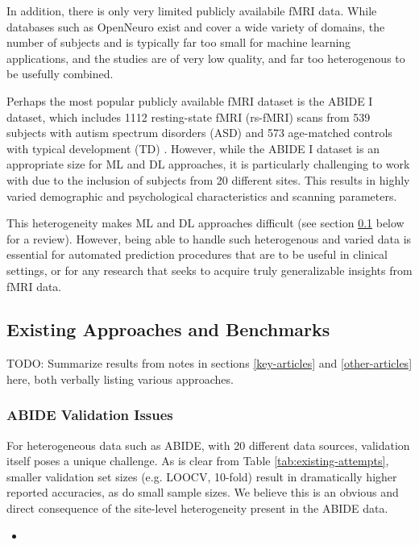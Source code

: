 \documentclass[10pt]{article}
\begin{document}
In addition, there is only very limited publicly availabile fMRI data. While databases such as
OpenNeuro \citep{markiewiczOpenNeuroOpenResource2021} exist and cover a wide variety of domains, the
number of subjects and is typically far too small for machine learning applications, and the studies
are of very  low quality, and far too heterogenous to be usefully combined.

Perhaps the most popular publicly available fMRI dataset is the ABIDE I dataset, which includes 1112
resting-state fMRI (rs-fMRI) scans from 539 subjects with autism spectrum disorders (ASD) and 573
age-matched controls with typical development (TD) \citep{dimartinoAutismBrainImaging2014}. However,
while the ABIDE I dataset is an appropriate size for ML and DL approaches, it is particularly
challenging to work with due to the inclusion of subjects from 20 different sites. This results in
highly varied demographic and psychological characteristics and scanning parameters.

This heterogeneity makes ML and DL approaches difficult (see section \ref{existing-attempts} below
for a review). However, being able to handle such heterogenous and varied data is essential for
automated prediction procedures that are to be useful in clinical settings, or for any research that
seeks to acquire truly generalizable insights from fMRI data.

\subsection{Existing Approaches and Benchmarks} \label{existing-attempts}

TODO: Summarize results from notes in sections \ref{key-articles} and \ref{other-articles} here,
both verbally listing various approaches.

\subsubsection{ABIDE Validation Issues}

For heterogeneous data such as ABIDE, with 20 different data sources, validation itself poses a
unique challenge. As is clear from Table \ref{tab:existing-attempts}, smaller validation set sizes
(e.g. LOOCV, 10-fold) result in dramatically higher reported accuracies, as do small sample sizes.
We believe this is an obvious and direct consequence of the site-level heterogeneity present in the
ABIDE data.

\begin{itemize}
  \item
\end{itemize}
\end{document}
